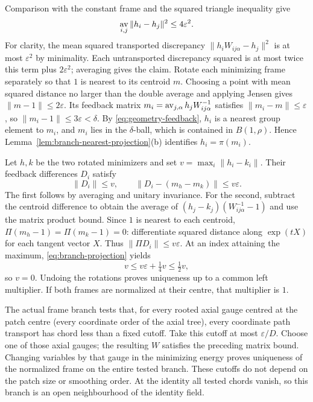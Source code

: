 Comparison with the constant frame and the squared triangle
inequality give
\[
 \mathop{\rm av}_{i,j}\|h_i-h_j\|^2\le4\varepsilon^2.
\]
For clarity, the mean squared transported discrepancy
$\|h_iW_{ij\alpha}-h_j\|^2$ is at most $\varepsilon^2$ by
minimality. Each untransported discrepancy squared is at most twice
this term plus $2\varepsilon^2$; averaging gives the claim.
Rotate each minimizing frame separately so that $1$ is nearest to
its centroid $m$. Choosing a point with mean squared distance no
larger than the double average and applying Jensen gives
$\|m-1\|\le2\varepsilon$. Its feedback matrix
$m_i=\mathop{\rm av}_{j,\alpha}h_jW_{ij\alpha}^{-1}$ satisfies
$\|m_i-m\|\le\varepsilon$, so $\|m_i-1\|\le3\varepsilon<\delta$.
By \eqref{eq:geometry-feedback}, $h_i$ is a nearest group element to
$m_i$, and $m_i$ lies in the $\delta$-ball, which is contained in
$B(1,\rho)$. Hence
Lemma~\ref{lem:branch-nearest-projection}(b) identifies $h_i=\pi(m_i)$.

Let $h,k$ be the two rotated minimizers and set
$v=\max_i\|h_i-k_i\|$. Their feedback differences $D_i$ satisfy
\[
 \|D_i\|\le v,\qquad
 \|D_i-(m_h-m_k)\|\le v\varepsilon.
\]
The first follows by averaging and unitary invariance. For the second,
subtract the centroid difference to obtain the average of
$(h_j-k_j)(W_{ij\alpha}^{-1}-1)$ and use the matrix product bound.
Since $1$ is nearest to each centroid,
$\Pi(m_h-1)=\Pi(m_k-1)=0$: differentiate squared distance along
$\exp(tX)$ for each tangent vector $X$. Thus
$\|\Pi D_i\|\le v\varepsilon$. At an index attaining the maximum,
\eqref{eq:branch-projection} yields
\[
 v\le v\varepsilon+\tfrac14v\le\tfrac12v,
\]
so $v=0$. Undoing the rotations proves uniqueness up to a common
left multiplier. If both frames are normalized at their centre,
that multiplier is $1$.

The actual frame branch tests that, for every rooted axial gauge
centred at the patch centre (every coordinate order of the axial
tree), every coordinate path transport has chord less than a fixed
cutoff. Take this cutoff at most $\varepsilon/D$. Choose one of
those axial gauges; the resulting $W$ satisfies the preceding matrix
bound. Changing variables by that gauge in the minimizing energy
proves uniqueness of the normalized frame on the entire tested
branch. These cutoffs do not depend on the patch size or smoothing
order. At the identity all tested chords vanish, so this branch is
an open neighbourhood of the identity field.

